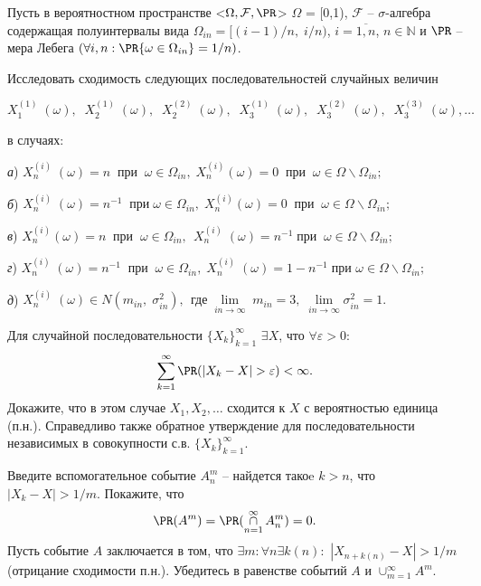 \begin{problem}
Пусть в вероятностном пространстве  <$\Omega, \mathcal{F},\PR$>  $\Omega$ = [0,1), $\mathcal{F}$  -- $\sigma$-алгебра содержащая полуинтервалы вида $\Omega _{in} =[(i-1)/n,\; i/n)$,  $i = \overline{1,n}$, $n \in \mathbb{N}$  и $\PR$ --мера  Лебега $(\forall i,n:\PR\{ \omega \in \Omega _{in} \} =1/n)$.

Исследовать сходимость следующих последовательностей случайных величин 

$X_{1}^{(1)} \; (\omega ),\; \; X_{2}^{(1)} \; (\omega ),\; \; X_{2}^{(2)} \; (\omega ),\; \; X_{3}^{(1)} \; (\omega ),\; \; X_{3}^{(2)} \; (\omega ),\; \; X_{3}^{(3)} \; (\omega ),\ldots $

в случаях:

\textit{а}) $X_{n}^{(i)} \; (\omega )=n\; \; \text{при}\; \; \omega \in \Omega _{in} ,\; X_{n}^{(i)} (\omega )=0\; \; \text{при}\; \; \omega \in \Omega \backslash \Omega _{in} ;$

\textit{б}) $X_{n}^{(i)} \; (\omega )=n^{-1} \; \; \text{при} \; \omega \in \Omega _{in} ,\; X_{n}^{(i)} (\omega )=0\; \; \text{при} \; \; \omega \in \Omega \backslash \Omega _{in} ;$

\textit{в}) $X_{n}^{(i)} (\omega )=n\; \; \text{при}\; \; \omega \in \Omega _{in} ,\; \, X_{n}^{(i)} \; (\omega )=n^{-1} \; \text{при}\; \; \omega \in \Omega \backslash \Omega _{in} ;$

\textit{г}) $X_{n}^{(i)} \; (\omega )=n^{-1} \; \; \text{при}\; \; \omega \in \Omega _{in} ,\; X_{n}^{(i)} \; (\omega )=1-n^{-1} \; \text{при}$ $\omega \in \Omega \backslash \Omega _{in} ;$

\textit{д}) $X_{n}^{(i)} \; (\omega )\in N(m_{in} ,\; \sigma _{in}^{2} ),\; \, \text{где}\; \mathop{\lim }\limits_{in\to \infty } \; m_{in} =3,\; \mathop{\lim }\limits_{in\to \infty } \sigma _{in}^{2} =1.$
\end{problem}


\begin{problem}
Для случайной последовательности $\{X_k\}_{k=1}^{\infty}$  $\exists X$, что $\forall \varepsilon >0$: 
\[
\sum \limits_{k=1}^{\infty} \PR(|X_k - X| > \varepsilon) < \infty.
\] 
Докажите, что в этом случае $X_1, X_2, \ldots$ сходится к $X$ с вероятностью единица (п.н.). Справедливо также обратное утверждение для последовательности независимых в совокупности с.в. $\{X_k\}_{k=1}^{\infty}$.
\end{problem}

\begin{ordre}
Введите вспомогательное событие $A_n^m$ -- найдется такоe $k > n$, что $|X_k - X| > 1/m$. Покажите, что 
\[
\PR(A^m) = \PR(\mathop{\cap} \limits_{n=1}^{\infty} A_n^m) = 0.
\] 
Пусть событие  $A$ заключается в том, что  $\exists m: \forall n \exists k(n):$ $ |X_{n+k(n)} - X| > 1/m$ (отрицание сходимости п.н.). Убедитесь в равенстве событий  $A$ и $\cup_{m=1}^{\infty} A^m$.
\end{ordre}

